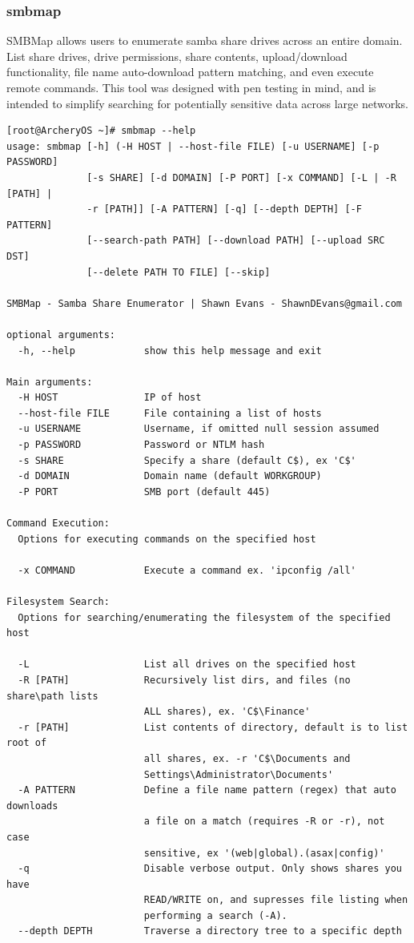 \documentclass{article}
\begin{document}
\subsubsection{smbmap}
SMBMap allows users to enumerate samba share drives across an entire domain. List share drives, drive permissions, share contents, upload/download functionality, file name auto-download pattern matching, and even execute remote commands. This tool was designed with pen testing in mind, and is intended to simplify searching for potentially sensitive data across large networks.
\begin{lstlisting}
[root@ArcheryOS ~]# smbmap --help
usage: smbmap [-h] (-H HOST | --host-file FILE) [-u USERNAME] [-p PASSWORD]
              [-s SHARE] [-d DOMAIN] [-P PORT] [-x COMMAND] [-L | -R [PATH] |
              -r [PATH]] [-A PATTERN] [-q] [--depth DEPTH] [-F PATTERN]
              [--search-path PATH] [--download PATH] [--upload SRC DST]
              [--delete PATH TO FILE] [--skip]

SMBMap - Samba Share Enumerator | Shawn Evans - ShawnDEvans@gmail.com

optional arguments:
  -h, --help            show this help message and exit

Main arguments:
  -H HOST               IP of host
  --host-file FILE      File containing a list of hosts
  -u USERNAME           Username, if omitted null session assumed
  -p PASSWORD           Password or NTLM hash
  -s SHARE              Specify a share (default C$), ex 'C$'
  -d DOMAIN             Domain name (default WORKGROUP)
  -P PORT               SMB port (default 445)

Command Execution:
  Options for executing commands on the specified host

  -x COMMAND            Execute a command ex. 'ipconfig /all'

Filesystem Search:
  Options for searching/enumerating the filesystem of the specified host

  -L                    List all drives on the specified host
  -R [PATH]             Recursively list dirs, and files (no share\path lists
                        ALL shares), ex. 'C$\Finance'
  -r [PATH]             List contents of directory, default is to list root of
                        all shares, ex. -r 'C$\Documents and
                        Settings\Administrator\Documents'
  -A PATTERN            Define a file name pattern (regex) that auto downloads
                        a file on a match (requires -R or -r), not case
                        sensitive, ex '(web|global).(asax|config)'
  -q                    Disable verbose output. Only shows shares you have
                        READ/WRITE on, and supresses file listing when
                        performing a search (-A).
  --depth DEPTH         Traverse a directory tree to a specific depth


\end{lstlisting}
\end{document}
